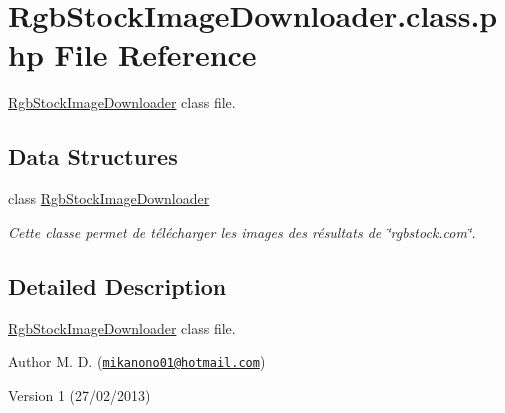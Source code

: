 \hypertarget{_rgb_stock_image_downloader_8class_8php}{\section{Rgb\-Stock\-Image\-Downloader.\-class.\-php File Reference}
\label{_rgb_stock_image_downloader_8class_8php}
}


\hyperlink{class_rgb_stock_image_downloader}{Rgb\-Stock\-Image\-Downloader} class file.  


\subsection*{Data Structures}
\begin{DoxyCompactItemize}
\item 
class \hyperlink{class_rgb_stock_image_downloader}{Rgb\-Stock\-Image\-Downloader}
\begin{DoxyCompactList}\small\item\em Cette classe permet de télécharger les images des résultats de \char`\"{}rgbstock.\-com\char`\"{}. \end{DoxyCompactList}\end{DoxyCompactItemize}


\subsection{Detailed Description}
\hyperlink{class_rgb_stock_image_downloader}{Rgb\-Stock\-Image\-Downloader} class file. \begin{DoxyAuthor}{Author}
M. D. (\href{mailto:mikanono01@hotmail.com}{\tt mikanono01@hotmail.\-com}) 
\end{DoxyAuthor}
\begin{DoxyVersion}{Version}
1 (27/02/2013) 
\end{DoxyVersion}
